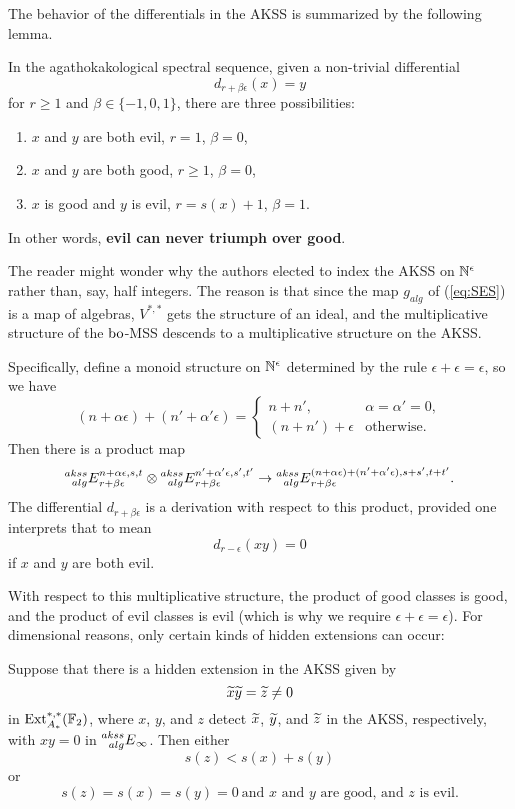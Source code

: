 The behavior of the differentials in the AKSS is summarized by the following lemma.
\begin{lem}\label{lem:akdr}
In the agathokakological spectral sequence, given a non-trivial differential
$$ d_{r + \beta\epsilon}(x) = y $$
for $r \ge 1$ and $\beta \in \{ -1,0,1\}$, there are three possibilities:
\begin{enumerate}
\item $x$ and $y$ are both evil, $r = 1$, $\beta = 0$,
\item $x$ and $y$ are both good, $r \ge 1$, $\beta = 0$,
\item $x$ is good and $y$ is evil, $r = s(x)+1$, $\beta = 1$. 
\end{enumerate}
In other words, {\bf evil can never triumph over good}.
\end{lem}

The reader might wonder why the authors elected to index the AKSS on $\mathbb{N}^\epsilon$ rather than, say, half integers.  The reason is that since the map $g_{alg}$ of (\ref{eq:SES}) is a map of algebras, $V^{*,*}$ gets the structure of an ideal, and the multiplicative structure of the $\mathrm{bo}$-MSS descends to a multiplicative structure on the AKSS.  

Specifically, define a monoid structure on $\mathbb{N}^\epsilon$
determined by the rule $\epsilon+\epsilon = \epsilon$, so we have
$$ (n + \alpha \epsilon) + (n'+ \alpha' \epsilon) = 
\begin{cases}
n + n', & \alpha = \alpha' = 0, \\
(n+n') + \epsilon & \text{otherwise}.
\end{cases}
$$
Then there is a product map
$$ \prescript{akss}{alg}{E}^{n+\alpha \epsilon, s, t}_{r+\beta\epsilon} \otimes 
\prescript{akss}{alg}{E}^{n'+\alpha' \epsilon, s', t'}_{r+\beta\epsilon}
\rightarrow \prescript{akss}{alg}{E}^{(n+\alpha \epsilon)+(n'+\alpha' \epsilon), s+s', t+t'}_{r+\beta\epsilon}. $$
The differential $d_{r+\beta\epsilon}$ is a derivation with respect to this product, provided one interprets that to mean
$$ d_{r-\epsilon}(xy) = 0 $$
if $x$ and $y$ are both evil.

With respect to this multiplicative structure, the product of good classes is good, and the product of evil classes is evil (which is why we require $\epsilon + \epsilon = \epsilon$).  For dimensional reasons, only certain kinds of hidden extensions can occur:

\begin{lem}\label{lem:akhe}
Suppose that there is a hidden extension in the AKSS given by
\[ \widetilde{x}\widetilde{y} = \widetilde{z} \ne 0 \]
in $\operatorname{Ext}^{*,*}_{A_*}(\mathbb{F}_2)$, where 
$x$, $y$, and $z$ detect $\widetilde{x}$, $\widetilde{y}$, and $\widetilde{z}$ in the AKSS, respectively, with $xy = 0$ in $\prescript{akss}{alg}{E}_\infty$.  Then either
\[ s(z) < s(x) + s(y) \]
or
\[ s(z) = s(x) = s(y) = 0 \: \text{and $x$ and $y$ are good, and $z$ is evil.}  \]
\end{lem}

